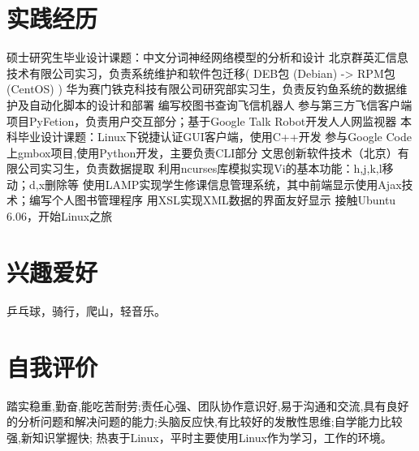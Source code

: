 \documentclass[a4paper]{moderncv}
\begin{document}
\begin{CJK*}{UTF8}{gbsn}
\section{实践经历}
{ 硕士研究生毕业设计课题：中文分词神经网络模型的分析和设计 }
{ 北京群英汇信息技术有限公司实习，负责系统维护和软件包迁移( DEB包 (Debian) -> RPM包 (CentOS) ) }
{ 华为赛门铁克科技有限公司研究部实习生，负责反钓鱼系统的数据维护及自动化脚本的设计和部署}
{ 编写校图书查询飞信机器人}
{ 参与第三方飞信客户端项目PyFetion，负责用户交互部分；基于Google Talk Robot开发人人网监视器}
{ 本科毕业设计课题：Linux下锐捷认证GUI客户端，使用C++开发 }
{ 参与Google Code上gmbox项目,使用Python开发，主要负责CLI部分 }
{ 文思创新软件技术（北京）有限公司实习生，负责数据提取 }
{ 利用ncurses库模拟实现Vi的基本功能：h,j,k,l移动；d,x删除等 }
{ 使用LAMP实现学生修课信息管理系统，其中前端显示使用Ajax技术；编写个人图书管理程序 }
{ 用XSL实现XML数据的界面友好显示 }
{ 接触Ubuntu 6.06，开始Linux之旅}
\section{兴趣爱好}
\cvitem{}
{
\small 乒乓球，骑行，爬山，轻音乐。
}
\section{自我评价}
\cvitem{}{}
{

踏实稳重,勤奋,能吃苦耐劳;责任心强、团队协作意识好,易于沟通和交流,具有良好的分析问题和解决问题的能力;头脑反应快,有比较好的发散性思维;自学能力比较强,新知识掌握快;
热衷于Linux，平时主要使用Linux作为学习，工作的环境。
}
\closesection
\end{CJK*}
\end{document}
